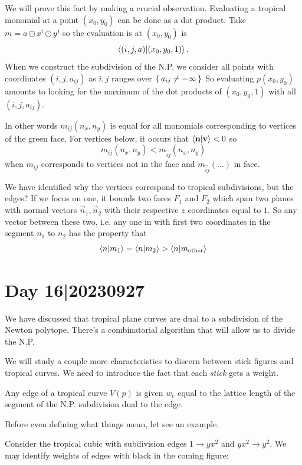 \documentclass[12pt]{memoir}
\theoremstyle{definition}
\begin{document}
We will prove this fact by making a crucial observation. Evaluating a tropical monomial at a point $(x_0,y_0)$ can be done as a dot product. Take $m=a\odot x^i\odot y^j$ so the evaluation is at $(x_0,y_0)$ is 
$$\braket{(i,j,a)}{(x_0,y_0,1)}.$$
When we construct the subdivision of the N.P. we consider all points with coordinates $(i,j,a_{ij})$ as $i,j$ ranges over $\{\,a_{ij}\neq -\infty\,\}$
So evaluating $p(x_0,y_0)$ amounts to looking for the maximum of the dot products of $(x_0,y_0,1)$ with all $(i,j,a_{ij})$.\par 
{}\par 
In other words $m_{ij}(n_x,n_y)$ is equal for all monomials corresponding to vertices of the green face. For vertices below, it occurs that $\braket{\mathbf{n}}{\mathbf{v}}<0$ so 
$$m_{ij}(n_x,n_y)<m_{\tilde i\tilde j}(n_x,n_y)$$
when $m_{ij}$ corresponds to vertices not in the face and $m_{\tilde i\tilde j}(\dots)$ in face.\par 
We have identified why the vertices correspond to tropical subdivisions, but the edges? If we focus on one, it bounds two faces $F_1$ and $F_2$ which span two planes with normal vectors $\vec n_1,\vec n_2$ with their respective $z$ coordinates equal to $1$. So any vector between these two, i.e. any one in with first two coordinates in the segment $n_1$ to $n_2$ has the property that 
$$\braket{n}{m_1}=\braket{n}{m_2}>\braket{n}{m_{\text{other}}}$$ %

\section{Day 16|20230927}

We have discussed that tropical plane curves are dual to a subdivision of the Newton polytope. There's a combinatorial algorithm that will allow us to divide the N.P.\par 
We will study a couple more characteristics to discern between stick figures and tropical curves. We need to introduce the fact that each \emph{stick} gets a weight.

\begin{Def}
    Any edge of a tropical curve $V(p)$ is given  $w_e$ equal to the lattice length of the segment of the N.P. subdivision dual to the edge.
\end{Def}

Before even defining what things mean, let see an example. 

\begin{Ex}
    Consider the tropical cubic with subdivision edges $1\to yx^2$ and $yx^2\to y^2$. We may identify weights of edges with black in the coming figure:
    \begin{figure}[h!]
        \centering
    \end{figure}
\end{Ex}
\end{document}
